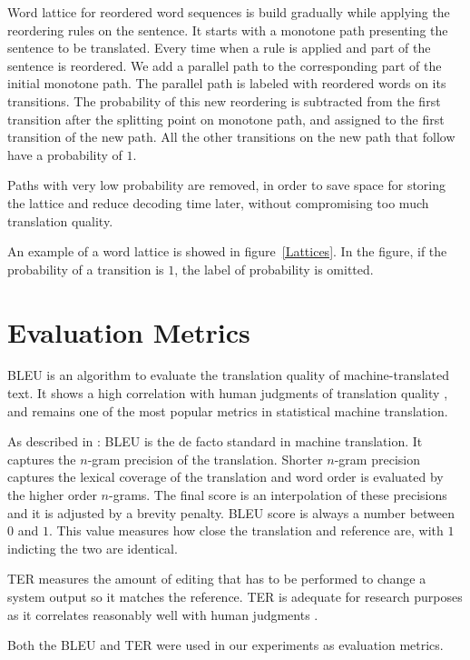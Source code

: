 Word lattice for reordered word sequences is build gradually while applying the reordering rules on the sentence. It starts with a monotone path presenting the sentence to be translated. Every time when a rule is applied and part of the sentence is reordered. We add a parallel path to the corresponding part of the initial monotone path. The parallel path is labeled with reordered words on its transitions. The probability of this new reordering is subtracted from the first transition after the splitting point on monotone path, and assigned to the first transition of the new path. All the other transitions on the new path that follow have a probability of $1$.

Paths with very low probability are removed, in order to save space for storing the lattice and reduce decoding time later, without compromising too much translation quality. 

An example of a word lattice is showed in figure~\ref{Lattices}. In the figure, if the probability of a transition is $1$, the label of probability is omitted.

\section{Evaluation Metrics}
\label{ch:Foundations:sec:bleu}

\ac{BLEU} is an algorithm to evaluate the translation quality of machine-translated text. It shows a high correlation with human judgments of translation quality \citep{bleuscore}, and remains one of the most popular metrics in statistical machine translation.

As described in \cite{metrics}: \ac{BLEU} is the de facto standard in machine translation. It captures the $n$-gram precision of the translation. Shorter $n$-gram precision captures the lexical coverage of the translation and word order is evaluated by the higher order $n$-grams. The final score is an interpolation of these precisions and it is adjusted by a brevity penalty. \ac{BLEU} score is always a number between $0$ and $1$. This value measures how close the translation and reference are, with $1$ indicting the two are identical.

\ac{TER} measures the amount of editing that has to be performed to change a system output so it matches the reference. \ac{TER} is adequate for research purposes as it correlates reasonably well with human judgments \citep{snover2006study}.

Both the \ac{BLEU} and \ac{TER} were used in our experiments as evaluation metrics.


